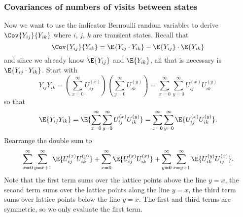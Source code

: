\documentclass[12pt]{article}
\begin{document}
\subsubsection*{Covariances of numbers of visits between states }

Now we want to use the indicator Bernoulli random variables to derive \(
\Cov{ Y_{ij} }{ Y_{ik} } \) where \( i \), \( j \), \( k \) are transient
states. Recall that
\[
    \Cov{ Y_{ij} }{ Y_{ik} } = \E{Y_{ij} \cdot Y_{ik}} - \E{Y_{ij}}
    \cdot \E{Y_{ik}}
\] and since we already know \( \E{Y_{ij}} \) and \( \E{Y_{ik}} \), all
that is necessary is \( \E{Y_{ij} \cdot Y_{ik}} \).  Start with
\[
    Y_{ij} Y_{ik} = \left( \sum\limits_{x=0}^{\infty} U_{ij}^{(x)}
    \right) \left( \sum\limits_{y=0}^{\infty} U_{ik}^{(y)} \right) =
    \sum\limits_{x=0}^{\infty} \sum\limits_{y=0}^{\infty} U_{ij}^{(x)} U_
    {ik}^{(y)}
\] so that
\[
    \E{Y_{ij} Y_{ik}} = \E{\sum\limits_{x=0}^{\infty} \sum\limits_{y=0}^
    {\infty} U_{ij}^{(x)} U_{ik}^{(y)}} = \sum\limits_{x=0}^{\infty}
    \sum\limits_{y=0}^{\infty} \E{U_{ij}^{(x)} U_{ik}^{(y)}}.
\] Rearrange the double sum to
\[
    \sum\limits_{x=0}^{\infty} \sum\limits_{y=x+1}^{\infty} \E{U_{ij}^{(x)}
    U_{ik}^{(y)}} + \sum\limits_{x=0}^{\infty} \E{U_{ij}^{(x)} U_{ik}^{(x)}}
    + \sum\limits_{y=0}^{\infty} \sum\limits_{x=y+1}^{\infty} \E{U_{ik}^
    {(y)} U_{ij}^{(x)}}.
\] Note that the first term sums over the lattice points above the line \(
y=x \), the second term sums over the lattice points along the line \(
y=x \), the third term sums over lattice points below the line \( y=x \).
The first and third terms are symmetric, so we only evaluate the first
term.
\end{document}
